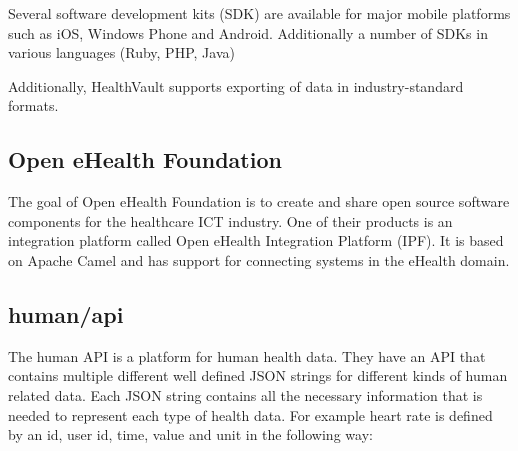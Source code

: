 Several software development kits (SDK) are available for major mobile platforms
such as iOS, Windows Phone and Android. Additionally a number of SDKs in various
languages (Ruby, PHP, Java)





Additionally, HealthVault supports exporting of data in industry-standard formats.



\subsection{Open eHealth Foundation} \nocite{OpenEHealthFoundation}

The goal of Open eHealth Foundation is to create and share open source software components for the healthcare ICT industry.
One of their products is an integration platform called Open eHealth Integration Platform (IPF).
It is based on Apache Camel and has support for connecting systems in the eHealth domain.

\subsection{human/api} \nocite{HumanAPI}

The human API is a platform for human health data. 
They have an API that contains multiple different well defined JSON strings for different kinds of human related data.
Each JSON string contains all the necessary information that is needed to represent each type of health data.
For example heart rate is defined by an id, user id, time, value and unit in the following way:

